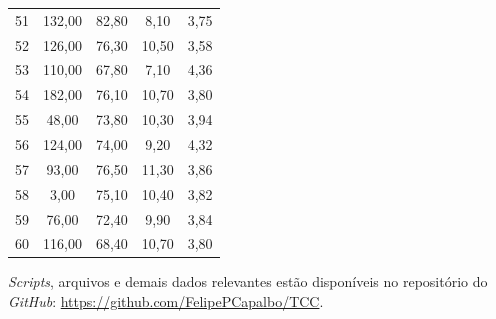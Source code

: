 \documentclass[
    12pt,                %
    openright,           %
    oneside,             %
    a4paper,             %
    english,             %
    spanish,             %
    brazil               %
]{ufscar}
\begin{document}
\begin{apendicesenv}
\begin{longtable}{c c c c c}
51 & 132,00 & 82,80 & 8,10  & 3,75 \\ 
52 & 126,00 & 76,30 & 10,50 & 3,58 \\ 
53 & 110,00 & 67,80 & 7,10  & 4,36 \\ 
54 & 182,00 & 76,10 & 10,70 & 3,80 \\ 
55 & 48,00  & 73,80 & 10,30 & 3,94 \\ 
56 & 124,00 & 74,00 & 9,20  & 4,32 \\ 
57 & 93,00  & 76,50 & 11,30 & 3,86 \\ 
58 & 3,00   & 75,10 & 10,40 & 3,82 \\ 
59 & 76,00  & 72,40 & 9,90  & 3,84 \\ 
60 & 116,00 & 68,40 & 10,70 & 3,80 \\ 
\end{longtable}

\textit{Scripts}, arquivos e demais dados relevantes estão disponíveis no repositório do \textit{GitHub}: \href{https://github.com/FelipePCapalbo/TCC}{https://github.com/FelipePCapalbo/TCC}.


\end{apendicesenv}

\printindex
\end{document}

